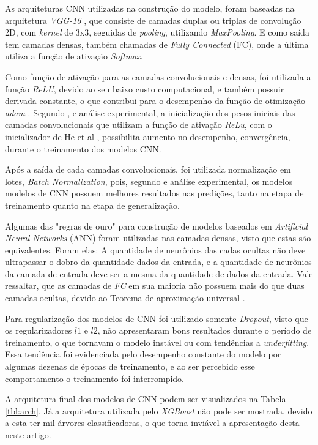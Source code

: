 As arquiteturas CNN utilizadas na construção do modelo, foram baseadas na arquitetura \emph{VGG-16} \cite{}, que consiste de camadas duplas ou triplas de convolução 2D, com \emph{kernel} de 3x3, seguidas de \emph{pooling}, utilizando \emph{MaxPooling}. E como saída tem camadas densas, também chamadas de \emph{Fully Connected} (FC), onde a última utiliza a função de ativação \emph{Softmax}.

Como função de ativação para as camadas convolucionais e densas, foi utilizada a função \emph{ReLU}, devido ao seu baixo custo computacional, e também possuir derivada constante, o que contribui para o desempenho da função de otimização \emph{adam} \cite{}. Segundo \cite{}, e análise experimental, a inicialização dos pesos iniciais das camadas convolucionais que utilizam a função de ativação \emph{ReLu}, com o inicializador de He et al \cite{}, possibilita aumento no desempenho, convergência, durante o treinamento dos modelos CNN.

Após a saída de cada camadas convolucionais, foi utilizada normalização em lotes, \emph{Batch Normalization}, pois, segundo \cite{} e análise experimental, os modelos modelos de CNN possuem melhores resultados nas predições, tanto na etapa de treinamento quanto na etapa de generalização.

Algumas das "regras de ouro" \cite{} para construção de modelos baseados em \emph{Artificial Neural Networks} (ANN) foram utilizadas nas camadas densas, visto que estas são equivalentes. Foram elas: A quantidade de neurônios das cadas ocultas não deve ultrapassar o dobro da quantidade dados da entrada, e a quantidade de neurônios da camada de entrada deve ser a mesma da quantidade de dados da entrada. Vale ressaltar, que as camadas de \emph{FC} em sua maioria não possuem mais do que duas camadas ocultas, devido ao Teorema de aproximação universal \cite{}.

Para regularização dos modelos de CNN foi utilizado somente \emph{Dropout}, visto que os regularizadores $l1$ e $l2$, não apresentaram bons resultados durante o período de treinamento, o que tornavam o modelo instável ou com tendências a \emph{underfitting}. Essa tendência foi evidenciada pelo desempenho constante do modelo por algumas dezenas de épocas de treinamento, e ao ser percebido esse comportamento o treinamento foi interrompido.

A arquitetura final dos modelos de CNN podem ser visualizados na Tabela \ref{tbl:arch}. Já a arquitetura utilizada pelo \emph{XGBoost} não pode ser mostrada, devido a esta ter mil árvores classificadoras, o que torna inviável a apresentação desta neste artigo.



\fi
